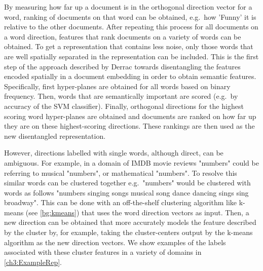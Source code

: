 By measuring how far up a document is in the orthogonal direction vector for a word, ranking of  documents on that word can be obtained, e.g.\ how 'Funny' it is relative to the other documents. After repeating this process for all documents on a word direction,  features that rank  documents on a variety of words can be obtained. To get a representation that contains less noise, only those words that are well spatially separated in the representation can be included. This is the first step of the approach described by Derrac \cite{Derrac2015} towards disentangling the features encoded spatially in a document embedding in order to obtain semantic features. Specifically, first  hyper-planes are obtained for all words based on binary frequency. Then,  words that are semantically important are scored (e.g.\ by accuracy of the SVM classifier). Finally, orthogonal directions for the highest scoring word hyper-planes are obtained and  documents are ranked on how far up they are on these highest-scoring directions. These rankings  are then used as the new disentangled representation.

However, directions labelled with single words, although direct, can be ambiguous. For example, in a domain of IMDB movie reviews "numbers" could be referring to musical "numbers", or mathematical "numbers".  To resolve this  similar words can be clustered together e.g.\  "numbers" would be clustered with words as follows  "numbers singing songs musical song dance dancing sings sing broadway". This can be done with an off-the-shelf clustering algorithm like k-means (see \ref{bg:kmeans}) that uses the word direction vectors as input. Then, a new direction can be obtained that more accurately models the feature described by the cluster by, for example, taking the cluster-centers output by the k-means algorithm as the new direction vectors.  We show examples of the labels associated with these cluster features  in a variety of domains in \ref{ch3:ExampleRep}. 
 
